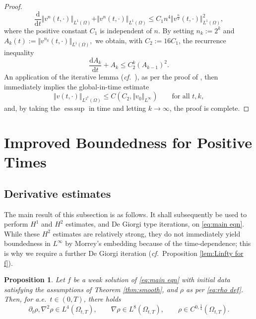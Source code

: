 \documentclass[11pt,a4paper,reqno]{amsart}
\newtheorem{prop}{Proposition}[section]
\theoremstyle{remark}
\theoremstyle{definition}
\numberwithin{equation}{section}
\DeclareMathOperator{\esssup}{ess \, sup}
\newcommand{\der}{\mathrm{d}}
\begin{document}
\begin{proof}
  \begin{equation*}
        \frac{\der}{\der t}\Vert v^{n}(t,\cdot)\Vert_{L^1(\Omega)} + \Vert v^{n} (t,\cdot) \Vert_{L^1(\Omega)} \leq C_1 n^4 \Vert v^{\frac{n}{2}}(t,\cdot) \Vert_{L^1(\Omega)}^2, 
    \end{equation*}
where the positive constant $C_1$ is independent of $n$. By setting $n_k := 2^k$ and $A_k(t) := \Vert v^{n_k}(t,\cdot) \Vert_{L^1(\Omega)}, $ we obtain, with $C_2 := 16 C_1$, the recurrence inequality 
    \begin{equation*}
        \frac{\der A_k}{\der t} + A_k \leq C_2^k (A_{k-1})^2. 
    \end{equation*}
An application of the iterative lemma \cite[Lemma 3.5]{reg1} (\textit{cf.}~\cite[Lemma 3.2]{KZ}), as per the proof of \cite[Theorem 1.3]{reg1}, then immediately implies the global-in-time estimate 
    \begin{equation*}
        \Vert v(t,\cdot) \Vert_{L^{2^k}(\Omega)} \leq C(C_2,\Vert v_0 \Vert_{L^\infty}) \qquad \text{for all } t, k, 
    \end{equation*}
    and, by taking the $\esssup$ in time and letting $k\to\infty$, the proof is complete. 
\end{proof}





\section{Improved Boundedness for Positive Times}\label{sec:boundedness positive times}




\subsection{Derivative estimates}\label{subsec:second deriv}


The main result of this subsection is as follows. It shall subsequently be used to perform $H^1$ and $H^2$ estimates, and De Giorgi type iterations, on \eqref{eq:main eqn}. While these $H^2$ estimates are relatively strong, they do not immediately yield boundedness in $L^\infty$ by Morrey's embedding because of the time-dependence; this is why we require a further De Giorgi iteration (\textit{cf.}~Proposition \ref{lem:Linfty for f}). 

\begin{prop}\label{lem:nabla rho in L8}
   Let $f$ be a weak solution of \eqref{eq:main eqn} with initial data satisfying the assumptions of Theorem \ref{thm:smooth}, and $\rho$ as per \eqref{eq:rho def}. Then, for a.e.~$t \in (0,T)$, there holds 
    \begin{equation*}
\partial_t \rho , \nabla^2 \rho \in L^4(\Omega_{t,T}), \qquad \nabla \rho \in L^8(\Omega_{t,T}), \qquad \rho \in C^{0,\frac{1}{4}}(\Omega_{t,T}). 
    \end{equation*}
\end{prop}
\end{document}
